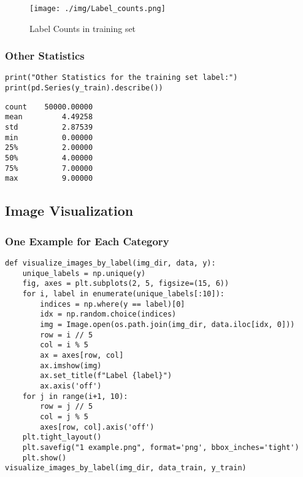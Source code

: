 \documentclass[a4paper,11pt]{article}
\begin{document}
\begin{figure}[H]
    \centering
    \texttt{[image: ./img/Label\_counts.png]}
    \caption[Label count] {Label Counts in training set}
\end{figure}

\subsubsection{Other Statistics}

\begin{listing}[!ht]
\begin{verbatim}
print("Other Statistics for the training set label:")
print(pd.Series(y_train).describe())
\end{verbatim}
\label{listing:python}
\end{listing}

\begin{verbatim}
count    50000.00000
mean         4.49258
std          2.87539
min          0.00000
25%          2.00000
50%          4.00000
75%          7.00000
max          9.00000
\end{verbatim}

\subsection{Image Visualization}
\subsubsection{One Example for Each Category}

\begin{listing}[!ht]
\begin{verbatim}
def visualize_images_by_label(img_dir, data, y):
    unique_labels = np.unique(y)
    fig, axes = plt.subplots(2, 5, figsize=(15, 6))
    for i, label in enumerate(unique_labels[:10]): 
        indices = np.where(y == label)[0]
        idx = np.random.choice(indices)
        img = Image.open(os.path.join(img_dir, data.iloc[idx, 0]))
        row = i // 5
        col = i % 5
        ax = axes[row, col] 
        ax.imshow(img)
        ax.set_title(f"Label {label}")
        ax.axis('off')
    for j in range(i+1, 10):
        row = j // 5
        col = j % 5
        axes[row, col].axis('off')
    plt.tight_layout()
    plt.savefig("1 example.png", format='png', bbox_inches='tight')
    plt.show()
visualize_images_by_label(img_dir, data_train, y_train)
\end{verbatim}
\label{listing:python}
\end{listing}
\end{document}
